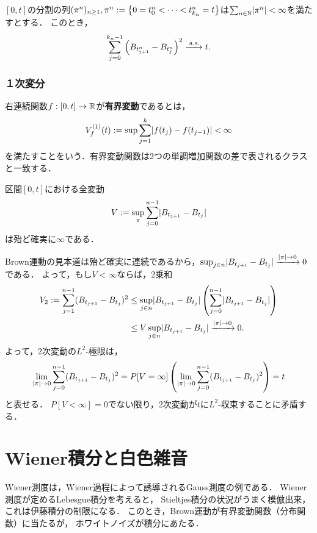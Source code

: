 \documentclass[uplatex,dvipdfmx]{jsreport}
\begin{document}
\begin{proposition}[2次変動の概収束]
    $[0,t]$の分割の列$(\pi^n)_{n\ge 1},\pi^n:=\left\{0=t^n_0<\cdots<t^n_{k_n}=t\right\}$は$\sum_{n\in\mathbb{N}}\lvert\pi^n\rvert<\infty$を満たすとする．
    このとき，
    \[\sum^{k_n-1}_{j=0}\left(B_{t^n_{j+1}}-B_{t^n_j}\right)^2\xrightarrow{\;\mathrm{a.s.}}t.\]
\end{proposition}

\subsubsection{１次変分}

\begin{definition}
    右連続関数$f:[0,t]\to\mathbb{R}$が\textbf{有界変動}であるとは，
    \[V_f^{(1)}(t):=\sup\sum^k_{j=1}\lvert f(t_j)-f(t_{j-1})\rvert<\infty\]
    を満たすことをいう．有界変動関数は2つの単調増加関数の差で表されるクラスと一致する．
\end{definition}


\begin{corollary}[全変動の発散]
    区間$[0,t]$における全変動
    \[V:=\sup_{\pi}\sum^{n-1}_{j=0}\lvert B_{t_{j+1}}-B_{t_j}\rvert\]
    は殆ど確実に$\infty$である．
\end{corollary}
\begin{Proof}
    Brown運動の見本道は殆ど確実に連続であるから，$\sup_{j\in n}\lvert B_{t_{j+1}}-B_{t_j}\rvert\xrightarrow{\lvert\pi\rvert\to0}0$である．
    よって，もし$V<\infty$ならば，2乗和
    \begin{align*}
        V_2:=\sum^{n-1}_{j=1}(B_{t_{j+1}}-B_{t_j})^2&\le\sup_{j\in n}\lvert B_{t_{j+1}}-B_{t_j}\rvert\left(\sum^{n-1}_{j=0}\lvert B_{t_{j+1}}-B_{t_j}\rvert\right)\\
        &\le V\sup_{j\in n}\lvert B_{t_{j+1}}-B_{t_j}\rvert\xrightarrow{\lvert\pi\rvert\to0}0.
    \end{align*}
    よって，2次変動の$L^2$-極限は，
    \[\lim_{\lvert\pi\rvert\to0}\sum^{n-1}_{j=0}(B_{t_{j+1}}-B_{t_j})^2=P[V=\infty]\left(\lim_{\lvert\pi\rvert\to0}\sum^{n-1}_{j=0}(B_{t_{j+1}}-B_{t_j})^2\right)=t\]
    と表せる．
    $P[V<\infty]=0$でない限り，2次変動が$t$に$L^2$-収束することに矛盾する．
\end{Proof}



\section{Wiener積分と白色雑音}\label{sec-Wiener-integral}

\begin{tcolorbox}[colframe=ForestGreen, colback=ForestGreen!10!white,breakable,colbacktitle=ForestGreen!40!white,coltitle=black,fonttitle=\bfseries\sffamily,
    title=]
    Wiener測度は，Wiener過程によって誘導されるGauss測度の例である．
    Wiener測度が定めるLebesgue積分を考えると，
    Stieltjes積分の状況がうまく模倣出来，これは伊藤積分の制限になる．
    このとき，Brown運動が有界変動関数（分布関数）に当たるが，
    ホワイトノイズが積分にあたる．
\end{tcolorbox}
\end{document}
